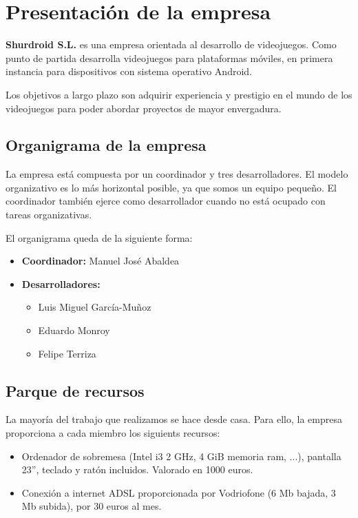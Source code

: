 \section{Presentación de la empresa}

{\bf Shurdroid S.L.} es una empresa orientada al desarrollo de videojuegos.
Como punto de partida desarrolla videojuegos para plataformas móviles, en
primera instancia para dispositivos con sistema operativo Android.

Los objetivos a largo plazo son adquirir experiencia y prestigio en el mundo de
los videojuegos para poder abordar proyectos de mayor envergadura.

\subsection{Organigrama de la empresa}

La empresa está compuesta por un coordinador y tres desarrolladores. El modelo
organizativo es lo más horizontal posible, ya que somos un equipo pequeño. El
coordinador también ejerce como desarrollador cuando no está ocupado con tareas
organizativas.

El organigrama queda de la siguiente forma:

\begin{itemize}

\item {\bf Coordinador:} Manuel José Abaldea

\item {\bf Desarrolladores:}

\begin{itemize}
\item Luis Miguel García-Muñoz
\item Eduardo Monroy
\item Felipe Terriza
\end{itemize}

\end{itemize}

\subsection{Parque de recursos}

La mayoría del trabajo que realizamos se hace desde casa. Para ello, la empresa
proporciona a cada miembro los siguients recursos:

\begin{itemize}
\item Ordenador de sobremesa (Intel i3 2 GHz, 4 GiB memoria ram, ...), pantalla
23'', teclado y ratón incluidos. Valorado en 1000 euros.
\item Conexión a internet ADSL proporcionada por Vodriofone (6 Mb bajada, 3 Mb
subida), por 30 euros al mes.
\end{itemize}

